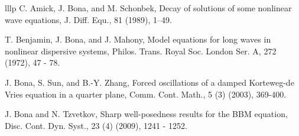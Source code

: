 \documentclass[10pt,a4paper,final]{article}
\numberwithin{equation}{section}
\begin{document}
\begin{thebibliography}{lllp}
 C. Amick, J. Bona, and M. Schonbek, Decay of solutions of some nonlinear wave equations, J. Diff. Equ., 81 (1989), 1–49. 

 T. Benjamin, J. Bona, and J. Mahony, Model equations for long waves in nonlinear dispersive systems, Philos. Trans. Royal Soc. London Ser. A, 272 (1972), 47 - 78.





 J. Bona, S. Sun, and B.-Y. Zhang, Forced oscillations of a damped Korteweg-de Vries equation in a quarter plane, Comm. Cont. Math., 5 (3) (2003), 369-400.




 J. Bona and N. Tzvetkov, Sharp well-posedness results for the BBM equation, Disc. Cont. Dyn. Syst., 23 (4) (2009), 1241 - 1252. 


\end{thebibliography}
\end{document}
